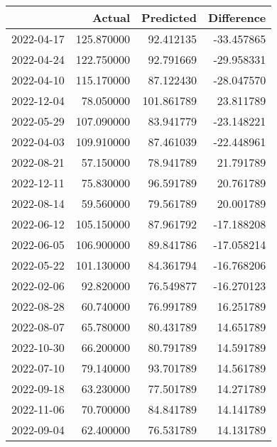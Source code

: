 \begin{tabular}{lrrr}
\toprule
 & Actual & Predicted & Difference \\
\midrule
2022-04-17 & 125.870000 & 92.412135 & -33.457865 \\
2022-04-24 & 122.750000 & 92.791669 & -29.958331 \\
2022-04-10 & 115.170000 & 87.122430 & -28.047570 \\
2022-12-04 & 78.050000 & 101.861789 & 23.811789 \\
2022-05-29 & 107.090000 & 83.941779 & -23.148221 \\
2022-04-03 & 109.910000 & 87.461039 & -22.448961 \\
2022-08-21 & 57.150000 & 78.941789 & 21.791789 \\
2022-12-11 & 75.830000 & 96.591789 & 20.761789 \\
2022-08-14 & 59.560000 & 79.561789 & 20.001789 \\
2022-06-12 & 105.150000 & 87.961792 & -17.188208 \\
2022-06-05 & 106.900000 & 89.841786 & -17.058214 \\
2022-05-22 & 101.130000 & 84.361794 & -16.768206 \\
2022-02-06 & 92.820000 & 76.549877 & -16.270123 \\
2022-08-28 & 60.740000 & 76.991789 & 16.251789 \\
2022-08-07 & 65.780000 & 80.431789 & 14.651789 \\
2022-10-30 & 66.200000 & 80.791789 & 14.591789 \\
2022-07-10 & 79.140000 & 93.701789 & 14.561789 \\
2022-09-18 & 63.230000 & 77.501789 & 14.271789 \\
2022-11-06 & 70.700000 & 84.841789 & 14.141789 \\
2022-09-04 & 62.400000 & 76.531789 & 14.131789 \\
\bottomrule
\end{tabular}
